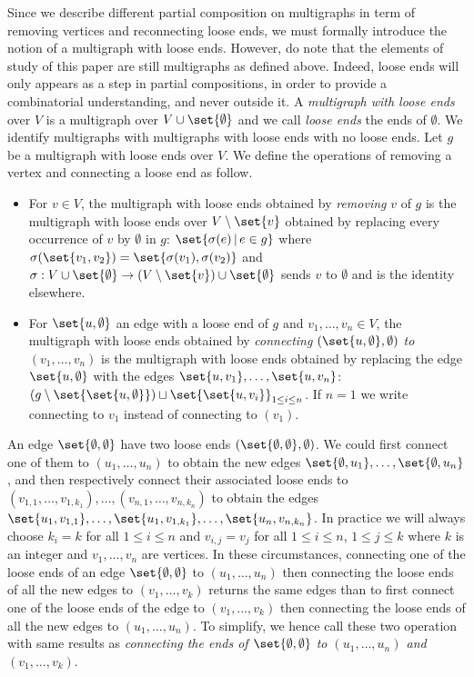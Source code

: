 Since we describe different partial composition on multigraphs in term of removing vertices and reconnecting loose ends, we must
formally introduce the notion of a multigraph with loose ends. However, do note that the elements of study of this paper are still multigraphs
as defined above. Indeed, loose ends will only appears as a step in partial compositions, in order to provide a combinatorial understanding,
and never outside it. 
A {\em multigraph with loose ends} over $V$ is a multigraph over $V\cup\set{\emptyset}$ and we call {\em loose ends} the ends of 
$\emptyset$. We identify multigraphs with multigraphs with loose ends with no loose ends. Let $g$ be a
multigraph with loose ends over $V$. We define the operations of removing a vertex and connecting a loose end as follow.
\begin{itemize}
    \item For $v\in V$, the multigraph with loose ends obtained by {\em removing} $v$ of $g$ is the multigraph with
    loose ends over $V\setminus\set{v}$ obtained by replacing every occurrence of $v$ by $\emptyset$ in $g$:
    $\set{\sigma(e)\,|\, e\in g}$ where $\sigma(\set{v_1,v_2}) = \set{\sigma(v_1),\sigma(v_2)}$ and 
    $\sigma:V\cup\set{\emptyset}\to (V\setminus \set{v})\cup\set{\emptyset}$ sends $v$ to $\emptyset$ and is the identity elsewhere. 
    \item For $\set{u,\emptyset}$ an edge with a loose end of $g$ and $v_1,\dots, v_n \in V$, the multigraph with loose ends obtained 
    by {\em connecting $(\set{u,\emptyset},\emptyset)$ to $(v_1,\dots, v_n)$} is the multigraph with loose ends obtained by replacing the edge 
    $\set{u,\emptyset}$ with the edges $\set{u,v_1},\dots,\set{u,v_n}$: $\left(g\setminus\set{\set{u,\emptyset}}\right)\sqcup\set{\set{u,v_i}}_{1\leq i\leq n}$. If $n=1$ we write connecting to $v_1$ instead of connecting to $(v_1)$.
\end{itemize}

\begin{rema}
    An edge $\set{\emptyset, \emptyset}$ have two loose ends $(\set{\emptyset, \emptyset}, \emptyset)$. We could first connect one of them
    to $(u_1,\dots, u_n)$ to obtain the new edges $\set{\emptyset, u_1}, \dots, \set{\emptyset, u_n}$, and then respectively connect their associated
    loose ends to $(v_{1,1}, \dots, v_{1,k_1}), \dots, (v_{n,1}, \dots, v_{n,k_n})$ to obtain the edges 
    $\set{u_1, v_{1,1}}, \dots, \set{u_1, v_{1,k_1}}, \dots, \set{u_n, v_{n,k_n}}$. In practice we will always choose $k_i = k$ for all $1\leq i \leq n$ 
    and $v_{i,j} = v_j$ for all $1\leq i \leq n$, $1\leq j \leq k$ where $k$ is an integer and $v_1,\dots, v_n$ are vertices. 
    In these circumstances, connecting one of the loose ends of an edge $\set{\emptyset, \emptyset}$ to $(u_1,\dots, u_n)$ then connecting the 
    loose ends of all the new edges to $(v_1,\dots, v_k)$ returns the same edges than to first connect one of the loose ends of the edge to 
    $(v_1,\dots, v_k)$ then connecting the loose ends of all the new edges to $(u_1,\dots, u_n)$. To simplify, we hence call these two operation with 
    same results as {\em connecting the ends of $\set{\emptyset, \emptyset}$ to $(u_1,\dots, u_n)$ and $(v_1,\dots, v_k)$}.
\end{rema}

